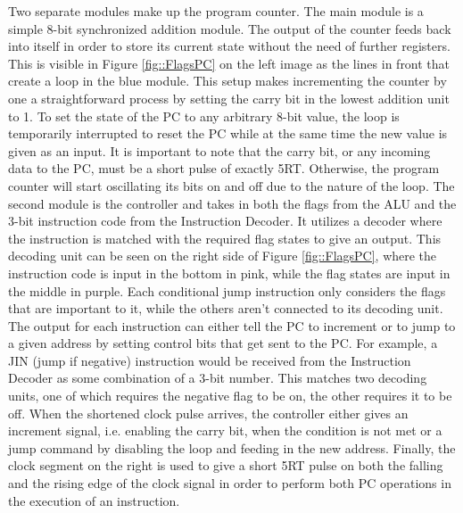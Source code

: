 Two separate modules make up the program counter. The main module is a simple 8-bit synchronized addition module. The output of the counter feeds back into itself in order to store its current state without the need of further registers. This is visible in Figure \ref{fig::FlagsPC} on the left image as the lines in front that create a loop in the blue module. This setup makes incrementing the counter by one a straightforward process by setting the carry bit in the lowest addition unit to 1. To set the state of the PC to any arbitrary 8-bit value, the loop is temporarily interrupted to reset the PC while at the same time the new value is given as an input. It is important to note that the carry bit, or any incoming data to the PC, must be a short pulse of exactly 5RT. Otherwise, the program counter will start oscillating its bits on and off due to the nature of the loop. The second module is the controller and takes in both the flags from the ALU and the 3-bit instruction code from the Instruction Decoder. It utilizes a decoder where the instruction is matched with the required flag states to give an output. This decoding unit can be seen on the right side of Figure \ref{fig::FlagsPC}, where the instruction code is input in the bottom in pink, while the flag states are input in the middle in purple. Each conditional jump instruction only considers the flags that are important to it, while the others aren't connected to its decoding unit. The output for each instruction can either tell the PC to increment or to jump to a given address by setting control bits that get sent to the PC. For example, a JIN (jump if negative) instruction would be received from the Instruction Decoder as some combination of a 3-bit number. This matches two decoding units, one of which requires the negative flag to be on, the other requires it to be off. When the shortened clock pulse arrives, the controller either gives an increment signal, i.e. enabling the carry bit, when the condition is not met or a jump command by disabling the loop and feeding in the new address. Finally, the clock segment on the right is used to give a short 5RT pulse on both the falling and the rising edge of the clock signal in order to perform both PC operations in the execution of an instruction.

